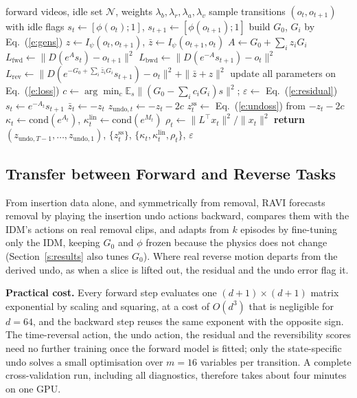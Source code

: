 \documentclass{jcse}
\newcommand{\method}{RAVI}
\newcommand{\zb}{\bar{z}}
\newcommand{\cond}{\mathrm{cond}}
\newcommand{\zss}{z^{\mathrm{ss}}}
\newcommand{\klin}{\kappa^{\mathrm{lin}}}
\begin{document}
\begin{algorithm}[t]
\caption{{\method}: training and reverse quantities}\label{a:wao}
\begin{algorithmic}[1]
\Require forward videos, idle set $\mathcal{N}$, weights $\lambda_b,\lambda_r,\lambda_a,\lambda_v$
\Repeat
	\State sample transitions $(o_t,o_{t+1})$ with idle flags
	\State $s_t\gets[\phi(o_t);1]$, $s_{t+1}\gets[\phi(o_{t+1});1]$
	\State build $G_0$, $G_i$ by Eq.~(\ref{e:gens})
	\State $z\gets I_\psi(o_t,o_{t+1})$, $\zb\gets I_\psi(o_{t+1},o_t)$
	\State $A\gets G_0+\sum_iz_iG_i$
	\State $L_{\mathrm{fwd}}\gets\|D(e^{A}s_t)-o_{t+1}\|^2$
	\State $L_{\mathrm{bwd}}\gets\|D(e^{-A}s_{t+1})-o_t\|^2$
	\State $L_{\mathrm{rev}}\gets\|D(e^{-G_0+\sum_i\zb_iG_i}s_{t+1})-o_t\|^2+\|\zb+z\|^2$
	\State update all parameters on Eq.~(\ref{e:loss})
\State $c\gets\arg\min_c\mathbb{E}_s\|(G_0-\sum_ic_iG_i)s\|^2$; $\varepsilon\gets$ Eq.~(\ref{e:residual})
	\State $s_t\gets e^{-A_t}s_{t+1}$ 
	\State $\zb_t\gets-z_t$ 
	\State $z_{\mathrm{undo},t}\gets-z_t-2c$ 
	\State $\zss_t\gets$ Eq.~(\ref{e:undoss}) from $-z_t-2c$ 
	\State $\kappa_t\gets\cond(e^{A_t})$, $\klin_t\gets\cond(e^{M_t})$ 
	\State $\rho_t\gets\|L^\top x_t\|^2/\|x_t\|^2$ 
\EndFor
\State \textbf{return} $(z_{\mathrm{undo},T-1},\dots,z_{\mathrm{undo},1})$, $\{\zss_t\}$, $\{\kappa_t,\klin_t,\rho_t\}$, $\varepsilon$
\end{algorithmic}
\end{algorithm}

\subsection{Transfer between Forward and Reverse Tasks}
From insertion data alone, and symmetrically from removal, {\method} forecasts removal by playing the insertion undo actions backward, compares them with the IDM's actions on real removal clips, and adapts from $k$ episodes by fine-tuning only the IDM, keeping $G_0$ and $\phi$ frozen because the physics does not change (Section~\ref{s:results} also tunes $G_0$). Where real reverse motion departs from the derived undo, as when a slice is lifted out, the residual and the undo error flag it.

\textbf{Practical cost.} Every forward step evaluates one $(d+1)\times(d+1)$ matrix exponential by scaling and squaring, at a cost of $O(d^3)$ that is negligible for $d=64$, and the backward step reuses the same exponent with the opposite sign. The time-reversal action, the undo action, the residual and the reversibility scores need no further training once the forward model is fitted; only the state-specific undo solves a small optimisation over $m=16$ variables per transition. A complete cross-validation run, including all diagnostics, therefore takes about four minutes on one GPU.
\end{document}
